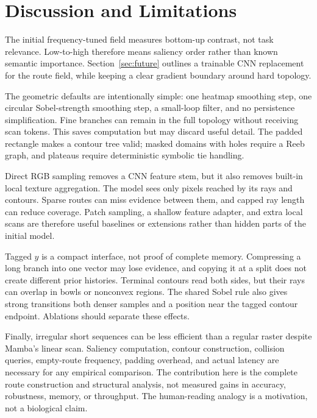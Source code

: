 \section{Discussion and Limitations}
\label{sec:discussion}

The initial frequency-tuned field measures bottom-up contrast, not task relevance. Low-to-high therefore means saliency order rather than known semantic importance. Section~\ref{sec:future} outlines a trainable CNN replacement for the route field, while keeping a clear gradient boundary around hard topology.

The geometric defaults are intentionally simple: one heatmap smoothing step, one circular Sobel-strength smoothing step, a small-loop filter, and no persistence simplification. Fine branches can remain in the full topology without receiving scan tokens. This saves computation but may discard useful detail. The padded rectangle makes a contour tree valid; masked domains with holes require a Reeb graph, and plateaus require deterministic symbolic tie handling.

Direct RGB sampling removes a CNN feature stem, but it also removes built-in local texture aggregation. The model sees only pixels reached by its rays and contours. Sparse routes can miss evidence between them, and capped ray length can reduce coverage. Patch sampling, a shallow feature adapter, and extra local scans are therefore useful baselines or extensions rather than hidden parts of the initial model.

Tagged $y$ is a compact interface, not proof of complete memory. Compressing a long branch into one vector may lose evidence, and copying it at a split does not create different prior histories. Terminal contours read both sides, but their rays can overlap in bowls or nonconvex regions. The shared Sobel rule also gives strong transitions both denser samples and a position near the tagged contour endpoint. Ablations should separate these effects.

Finally, irregular short sequences can be less efficient than a regular raster despite Mamba's linear scan. Saliency computation, contour construction, collision queries, empty-route frequency, padding overhead, and actual latency are necessary for any empirical comparison. The contribution here is the complete route construction and structural analysis, not measured gains in accuracy, robustness, memory, or throughput. The human-reading analogy is a motivation, not a biological claim.
